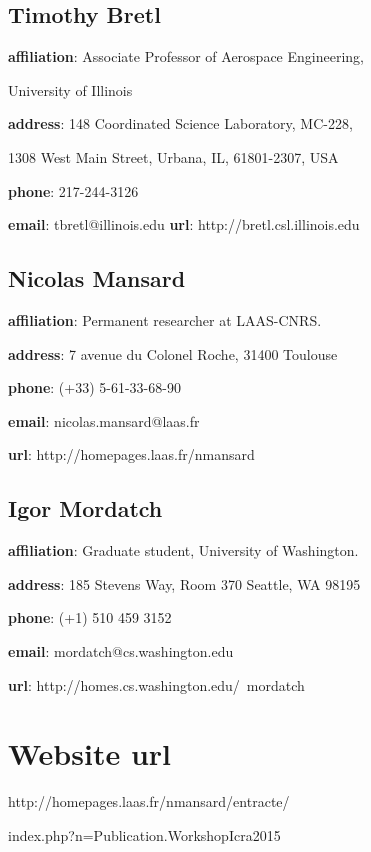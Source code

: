 \documentclass[conference]{IEEEtran}
\begin{document}
\subsection*{Timothy Bretl}
\textbf{affiliation}: Associate Professor of Aerospace Engineering,

 University of Illinois

\textbf{address}: 148 Coordinated Science Laboratory, MC-228,

 1308 West Main Street, Urbana, IL, 61801-2307, USA 

\textbf{phone}: 217-244-3126 

\textbf{email}: tbretl@illinois.edu 
\textbf{url}: http://bretl.csl.illinois.edu

\subsection*{Nicolas Mansard}
\textbf{affiliation}: Permanent researcher at LAAS-CNRS.

\textbf{address}: 7 avenue du Colonel Roche, 31400 Toulouse

\textbf{phone}: (+33) 5-61-33-68-90

\textbf{email}: nicolas.mansard@laas.fr

\textbf{url}: http://homepages.laas.fr/nmansard
\subsection*{Igor Mordatch}
\textbf{affiliation}: Graduate student, University of Washington.

\textbf{address}: 185 Stevens Way, Room 370 Seattle, WA 98195

\textbf{phone}: (+1) 510 459 3152

\textbf{email}: mordatch@cs.washington.edu

\textbf{url}: http://homes.cs.washington.edu/~mordatch


\section{Website url}
http://homepages.laas.fr/nmansard/entracte/

index.php?n=Publication.WorkshopIcra2015
\end{document}
